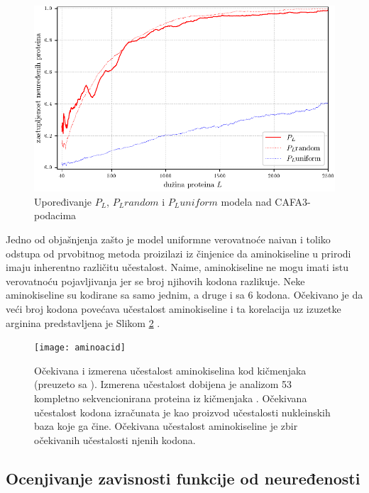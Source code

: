 \begin{figure}[th]
\centering
\includegraphics[]{plots/PL_F_cmp}
\caption{Upoređivanje $P_L$, $P_L random$ i $P_L uniform$ modela nad CAFA3-podacima}
\label{fig:PL2}
\end{figure}


Jedno od objašnjenja zašto je model uniformne verovatnoće naivan i toliko
odstupa od prvobitnog metoda proizilazi iz činjenice da aminokiseline u prirodi
imaju inherentno različitu učestalost. Naime, aminokiseline ne mogu  imati istu
verovatnoću pojavljivanja jer se  broj njihovih kodona razlikuje. Neke
aminokiseline su kodirane sa samo jednim, a druge i sa 6 kodona. Očekivano je
da veći broj kodona povećava učestalost aminokiseline i ta korelacija uz
izuzetke arginina predstavljena je Slikom \ref{fig:aminoacid}
\parencite{AKfrekvencija}.

\begin{figure}[th]
\centering
\texttt{[image: aminoacid]}
\caption{Očekivana i izmerena učestalost aminokiselina kod kičmenjaka (preuzeto sa \cite{AA_freq_link}).  \footnotesize
  Izmerena učestalost dobijena je analizom 53 kompletno sekvencionirana proteina iz kičmenjaka \cite{King1969}.
  Očekivana učestalost kodona izračunata je kao proizvod učestalosti nukleinskih baza koje ga čine.
  Očekivana učestalost aminokiseline je zbir očekivanih učestalosti njenih kodona.
}
\label{fig:aminoacid}
\end{figure}




\clearpage
\label{ocenjivanje}
\subsection{Ocenjivanje zavisnosti funkcije od neuređenosti}


